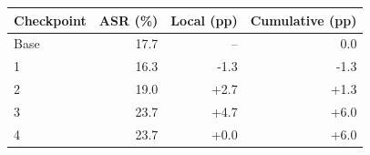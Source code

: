 \begin{tabular}{lrrr}
\toprule
Checkpoint & ASR (\%) & Local (pp) & Cumulative (pp) \\
\midrule
Base & 17.7 & -- & 0.0 \\
1 & 16.3 & -1.3 & -1.3 \\
2 & 19.0 & +2.7 & +1.3 \\
3 & 23.7 & +4.7 & +6.0 \\
4 & 23.7 & +0.0 & +6.0 \\
\bottomrule
\end{tabular}
